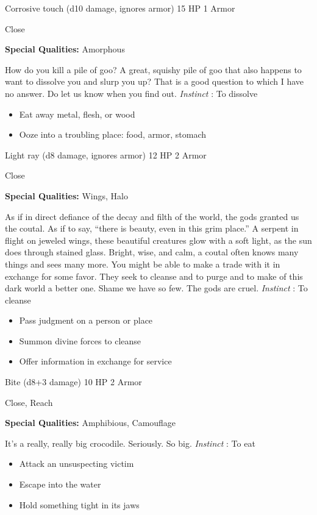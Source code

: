 

 Corrosive touch (d10 damage, ignores armor) 15 HP 1 Armor


 Close


 \textbf{Special Qualities:}
 Amorphous


 How do you kill a pile of goo? A great, squishy pile of goo that also happens to want to dissolve you and slurp you up? That is a good question to which I have no answer. Do let us know when you find out. \emph{Instinct}
: To dissolve
\begin{itemize}
\item Eat away metal, flesh, or wood
\item Ooze into a troubling place: food, armor, stomach

\end{itemize}




 Light ray (d8 damage, ignores armor) 12 HP 2 Armor


 Close


 \textbf{Special Qualities:}
 Wings, Halo


 As if in direct defiance of the decay and filth of the world, the gods granted us the coutal. As if to say, ``there is beauty, even in this grim place.'' A serpent in flight on jeweled wings, these beautiful creatures glow with a soft light, as the sun does through stained glass. Bright, wise, and calm, a coutal often knows many things and sees many more. You might be able to make a trade with it in exchange for some favor. They seek to cleanse and to purge and to make of this dark world a better one. Shame we have so few. The gods are cruel. \emph{Instinct}
: To cleanse
\begin{itemize}
\item Pass judgment on a person or place
\item Summon divine forces to cleanse
\item Offer information in exchange for service

\end{itemize}




 Bite (d8+3 damage) 10 HP 2 Armor


 Close, Reach


 \textbf{Special Qualities:}
 Amphibious, Camouflage


 It's a really, really big crocodile. Seriously. So big. \emph{Instinct}
: To eat
\begin{itemize}
\item Attack an unsuspecting victim
\item Escape into the water
\item Hold something tight in its jaws

\end{itemize}


